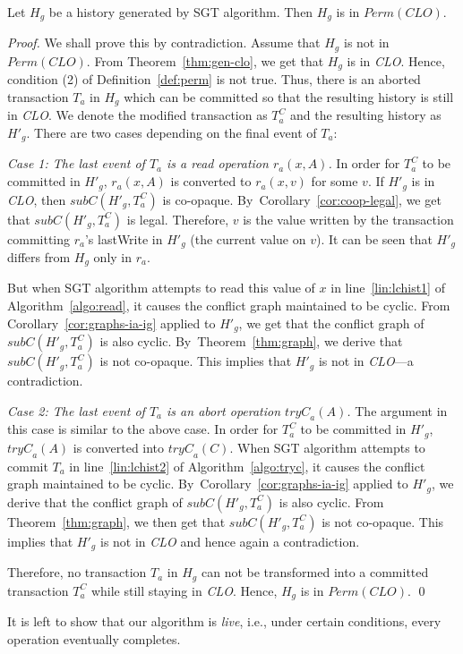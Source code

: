 \documentclass{llncs}
\newcommand{\thmref}[1]{Theorem~\ref{thm:#1}}
\newcommand{\corref}[1]{Corollary~\ref{cor:#1}}
\newcommand{\defref}[1]{Definition~\ref{def:#1}}
\newcommand{\op} {operation}
\newcommand{\clo} {\textit{CLO}}
\newcommand{\permfn}[1] {\textit{Perm}(#1)}
\newcommand{\lastw} {lastWrite}
\newcommand{\subs}[2]  {\textit{subC}(#2,#1)}
\newcommand{\tryc} {\textit{tryC}}
\newcommand{\coop} {co-opaque}
\newcommand{\sgt} {SGT}
\begin{document}
\begin{theorem}
\label{thm:perm}
Let $H_g$ be a history generated by \sgt{} algorithm. 
Then $H_g$ is in $\permfn{\clo}$. 
\end{theorem}
\begin{proof}
We shall prove this by contradiction. Assume that $H_g$ is not in
$\permfn{\clo}$. From Theorem~\ref{thm:gen-clo}, we get that $H_g$ is in \clo.
Hence, condition (2) of \defref{perm} is not true. 
Thus, there is an aborted transaction $T_a$ in $H_g$ which can be
committed so that the resulting history is still in \clo. We denote the
modified transaction as $T_a^C$ and the resulting history as $H'_g$. 
There are two cases depending on the final event of $T_a$: 

\noindent
\textit{Case 1: The last event of $T_a$ is a read \op{} $r_a(x,A)$.} 
In order for $T_a^C$ to be committed in $H'_g$, $r_a(x,A)$ is
converted  to $r_a(x,v)$ for some $v$. If $H'_g$ is in \clo, then  
$\subs{T_a^C}{H'_g}$ is \coop. By~\corref{coop-legal}, we get that
$\subs{T_a^C}{H'_g}$ 
is legal. 
Therefore, $v$ is the value written by the transaction committing
$r_a$'s  \lastw{} in $H'_g$ (the current value on $v$). It can be seen
that $H'_g$ differs from $H_g$ only in $r_a$. 

But when \sgt{} algorithm attempts to read this value of $x$ in 
line~\ref{lin:lchist1} of Algorithm~\ref{algo:read}, it causes the conflict graph
maintained to be cyclic. From \corref{graphs-ia-ig} applied to $H'_g$,
we get that the conflict graph of $\subs{T_a^C}{H'_g}$ is also cyclic. 
By~\thmref{graph}, we derive that $\subs{T_a^C}{H'_g}$ is not
\coop. This implies that $H'_g$ is not in \clo{}---a contradiction.

\noindent
\textit{Case 2: The last event of $T_a$ is an abort \op{} $\tryc_a(A)$.}  
The argument in this case is similar to the above
case.  In order for $T_a^C$ to be committed in $H'_g$, $\tryc_a(A)$ is
converted into $\tryc_a(C)$. When \sgt{} algorithm attempts to commit
$T_a$ in line~\ref{lin:lchist2} of Algorithm~\ref{algo:tryc}, it causes the conflict graph
maintained to be cyclic.
By~\corref{graphs-ia-ig} applied to $H'_g$,
we derive that the conflict graph of $\subs{T_a^C}{H'_g}$ is also cyclic.
From \thmref{graph}, we then get that $\subs{T_a^C}{H'_g}$ is not
\coop.  This implies that $H'_g$ is not in \clo{} and hence again a
contradiction.

Therefore, no transaction $T_a$ in $H_g$ can not be transformed into a
committed  transaction $T_a^C$ while still staying in \clo. 
Hence, $H_g$ is in $\permfn{\clo}$. \qed
\end{proof}
It is left to show that our algorithm is \emph{live}, i.e., under certain
conditions, every operation eventually completes.
\end{document}
